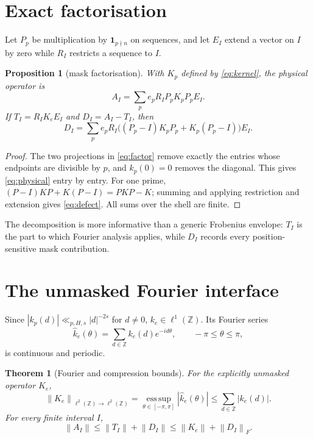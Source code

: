 \documentclass[10pt]{article}
\newtheorem{proposition}{Proposition}
\newtheorem{theorem}{Theorem}
\newcommand{\Z}{\mathbb Z}
\newcommand{\norm}[1]{\left\lVert #1\right\rVert}
\begin{document}
\section{Exact factorisation}

Let $P_p$ be multiplication by $\mathbf 1_{p\nmid n}$ on sequences, and let
$E_I$ extend a vector on $I$ by zero while $R_I$ restricts a sequence to $I$.

\begin{proposition}[mask factorisation]
With $K_p$ defined by \eqref{eq:kernel}, the physical operator is
\begin{equation}
 A_I=\sum_p e_pR_IP_pK_pP_pE_I. \label{eq:factor}
\end{equation}
If $T_I=R_IK_eE_I$ and $D_I=A_I-T_I$, then
\begin{equation}
 D_I=\sum_p e_pR_I\bigl((P_p-I)K_pP_p+K_p(P_p-I)\bigr)E_I. \label{eq:defect}
\end{equation}
\end{proposition}

\begin{proof}
The two projections in \eqref{eq:factor} remove exactly the entries whose
endpoints are divisible by $p$, and $k_p(0)=0$ removes the diagonal.  This
gives \eqref{eq:physical} entry by entry.  For one prime,
$(P-I)KP+K(P-I)=PKP-K$; summing and applying restriction and extension gives
\eqref{eq:defect}.  All sums over the shell are finite.
\end{proof}

The decomposition is more informative than a generic Frobenius envelope:
$T_I$ is the part to which Fourier analysis applies, while $D_I$ records
every position-sensitive mask contribution.

\section{The unmasked Fourier interface}

Since $|k_p(d)|\ll_{p,H,s}|d|^{-2s}$ for $d\ne0$, $k_e\in\ell^1(\Z)$.
Its Fourier series
\begin{equation}
 \widehat{k}_e(\theta)=\sum_{d\in\Z}k_e(d)e^{-id\theta},
 \qquad -\pi\leq\theta\leq\pi,
 \label{eq:symbol}
\end{equation}
is continuous and periodic.

\begin{theorem}[Fourier and compression bounds]
For the explicitly unmasked operator $K_e$,
\begin{equation}
 \norm{K_e}_{\ell^2(\Z)\to\ell^2(\Z)}
 =\operatorname*{ess\,sup}_{\theta\in[-\pi,\pi]}|\widehat{k}_e(\theta)|
 \leq\sum_{d\in\Z}|k_e(d)|. \label{eq:fourierbound}
\end{equation}
For every finite interval $I$,
\begin{equation}
 \norm{A_I}\leq\norm{T_I}+\norm{D_I}
 \leq\norm{K_e}+\norm{D_I}_F. \label{eq:triangle}
\end{equation}
\end{theorem}
\end{document}
